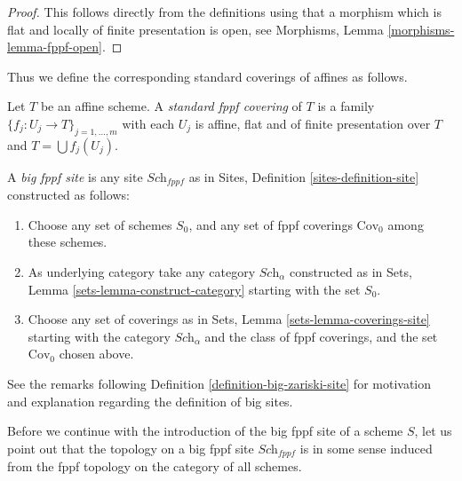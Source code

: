 \begin{proof}
This follows directly from the definitions using that a
morphism which is flat and locally of finite presentation is open,
see Morphisms, Lemma \ref{morphisms-lemma-fppf-open}.
\end{proof}

\noindent
Thus we define the corresponding standard coverings of affines as follows.

\begin{definition}
\label{definition-standard-fppf}
Let $T$ be an affine scheme. A {\it standard fppf covering}
of $T$ is a family $\{f_j : U_j \to T\}_{j = 1, \ldots, m}$
with each $U_j$ is affine, flat and of finite presentation over $T$
and $T = \bigcup f_j(U_j)$.
\end{definition}

\begin{definition}
\label{definition-big-fppf-site}
A {\it big fppf site} is any site $\textit{Sch}_{fppf}$ as in
Sites, Definition \ref{sites-definition-site} constructed as follows:
\begin{enumerate}
\item Choose any set of schemes $S_0$, and any set of fppf coverings
$\text{Cov}_0$ among these schemes.
\item As underlying category take any category $\textit{Sch}_\alpha$
constructed as in Sets, Lemma \ref{sets-lemma-construct-category}
starting with the set $S_0$.
\item Choose any set of coverings as in
Sets, Lemma \ref{sets-lemma-coverings-site} starting with the
category $\textit{Sch}_\alpha$ and the class of fppf coverings,
and the set $\text{Cov}_0$ chosen above.
\end{enumerate}
\end{definition}

\noindent
See the remarks following Definition \ref{definition-big-zariski-site}
for motivation and explanation regarding the definition of big sites.

\medskip\noindent
Before we continue with the introduction of the big fppf site of
a scheme $S$, let us point out that the topology on a big fppf site
$\textit{Sch}_{fppf}$ is in some sense induced from the fppf topology
on the category of all schemes.

